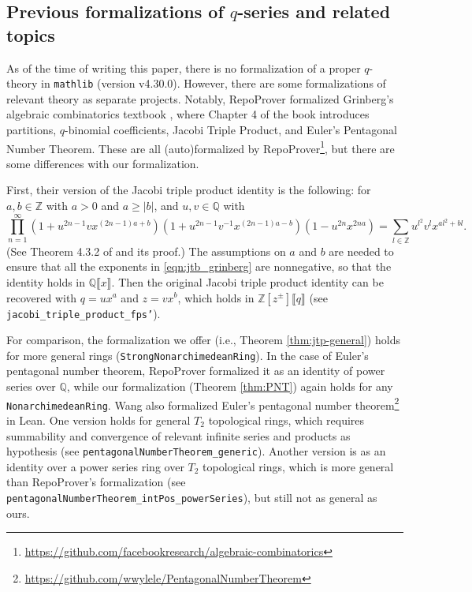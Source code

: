 \documentclass[12pt]{amsart}
\theoremstyle{definition}
\theoremstyle{remark}
\numberwithin{equation}{subsection}
\begin{document}
\subsection{Previous formalizations of $q$-series and related topics}

As of the time of writing this paper, there is no formalization of a proper $q$-theory in \texttt{mathlib} (version v4.30.0).
However, there are some formalizations of relevant theory as separate projects.
Notably, RepoProver \cite{repoprover} formalized Grinberg's algebraic combinatorics textbook \cite{grinberg}, where Chapter 4 of the book introduces partitions, $q$-binomial coefficients, Jacobi Triple Product, and Euler's Pentagonal Number Theorem.
These are all (auto)formalized by RepoProver\footnote{\url{https://github.com/facebookresearch/algebraic-combinatorics}}, but there are some differences with our formalization.

First, their version of the Jacobi triple product identity is the following: for $a, b \in \mathbb{Z}$ with $a > 0$ and $a \ge |b|$, and $u, v \in \mathbb{Q}$ with 
\begin{equation}
\label{eqn:jtb_grinberg}
    \prod_{n = 1}^{\infty} (1 + u^{2n-1}v x^{(2n-1)a+b})(1 + u^{2n-1}v^{-1} x^{(2n-1)a - b})(1 - u^{2n}x^{2na}) = \sum_{l \in \mathbb{Z}} u^{l^2} v^{l} x^{al^2 + bl}.
\end{equation}
(See Theorem 4.3.2 of \cite{grinberg} and its proof.)
The assumptions on $a$ and $b$ are needed to ensure that all the exponents in \eqref{eqn:jtb_grinberg} are nonnegative, so that the identity holds in $\mathbb{Q}\llbracket x \rrbracket$.
Then the original Jacobi triple product identity can be recovered with $q = ux^a$ and $z = vx^b$, which holds in $\mathbb{Z}[z^{\pm}]\llbracket q \rrbracket$ (see \texttt{jacobi\_triple\_product\_fps'}).

For comparison, the formalization we offer (i.e., Theorem \ref{thm:jtp-general}) holds for more general rings (\texttt{StrongNonarchimedeanRing}).
In the case of Euler's pentagonal number theorem, RepoProver formalized it as an identity of power series over $\mathbb{Q}$, while our formalization (Theorem \ref{thm:PNT}) again holds for any \texttt{NonarchimedeanRing}.
Wang also formalized Euler's pentagonal number theorem\footnote{\url{https://github.com/wwylele/PentagonalNumberTheorem}} in Lean. One version holds for general $T_2$ topological rings, which requires summability and convergence of relevant infinite series and products as hypothesis (see \texttt{pentagonalNumberTheorem\_generic}). Another version is as an identity over a power series ring over $T_2$ topological rings, which is more general than RepoProver's formalization (see \texttt{pentagonalNumberTheorem\_intPos\_powerSeries}), but still not as general as ours.
\end{document}
